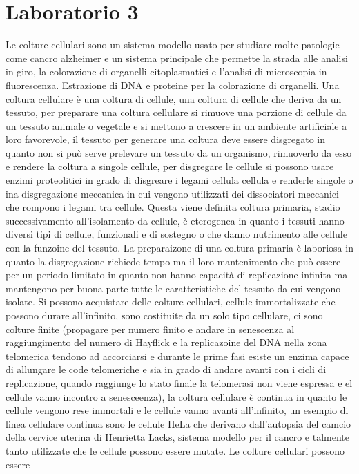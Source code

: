 			
\section{Laboratorio 3}
Le colture cellulari sono un sistema modello usato per studiare molte patologie come cancro alzheimer e un sistema principale che permette la strada alle analisi in giro, la colorazione
di organelli citoplasmatici e l'analisi di microscopia in fluorescenza. Estrazione di DNA e proteine per la colorazione di organelli. Una coltura cellulare \`e una coltura di cellule, 
una coltura di cellule che deriva da un tessuto, per preparare una coltura cellulare si rimuove una porzione di cellule da un tessuto animale o vegetale e si mettono a crescere in
un ambiente artificiale a loro favorevole, il tessuto per generare una coltura deve essere disgregato in quanto non si pu\`o serve prelevare un tessuto da un organismo, rimuoverlo da
esso e rendere la coltura a singole cellule, per disgregare le cellule si possono usare enzimi proteolitici in grado di disgreare i legami cellula cellula e renderle singole o ina
disgregazione meccanica in cui vengono utilizzati dei dissociatori meccanici che rompono i legami tra cellule. Questa viene definita coltura primaria, stadio successivamento 
all'isolamento da cellule, \`e eterogenea in quanto i tessuti hanno diversi tipi di cellule, funzionali e di sostegno o che danno nutrimento alle cellule con la funzoine del tessuto. 
La preparaizone di una coltura primaria \`e laboriosa in quanto la disgregazione richiede tempo ma il loro mantenimento che pu\`o essere per un periodo limitato in quanto non hanno
capacit\`a di replicazione infinita ma mantengono per buona parte tutte le caratteristiche del tessuto da cui vengono isolate. Si possono acquistare delle colture cellulari, cellule
immortalizzate che possono durare all'infinito, sono costituite da un solo tipo cellulare, ci sono colture finite (propagare per numero finito e andare in senescenza al raggiungimento
del numero di Hayflick e la replicazoine del DNA nella zona telomerica tendono ad accorciarsi e durante le prime fasi esiste un enzima capace di allungare le code telomeriche e sia in
grado di andare avanti con i cicli di replicazione, quando raggiunge lo stato finale la telomerasi non viene espressa e el cellule vanno incontro a senesceenza), la coltura cellulare \`e
continua in quanto le cellule vengono rese immortali e le cellule vanno avanti all'infinito, un esempio di linea cellulare continua sono le cellule HeLa che derivano dall'autopsia
del camcio della cervice uterina di Henrietta Lacks, sistema modello per il cancro e talmente tanto utilizzate che le cellule possono essere mutate. Le colture cellulari possono essere
